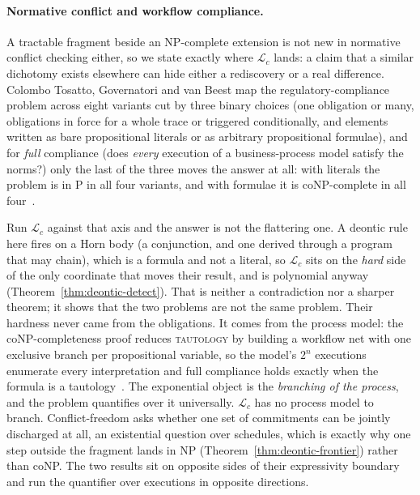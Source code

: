 \documentclass[11pt,a4paper]{article}
\theoremstyle{definition}
\theoremstyle{definition}
\theoremstyle{remark}
\begin{document}
\paragraph{Normative conflict and workflow compliance.} A tractable fragment beside an NP-complete extension is not new in normative conflict checking either, so we
state exactly where $\mathcal{L}_c$ lands: a claim that a similar dichotomy
exists elsewhere can hide either a rediscovery or a real difference. Colombo Tosatto, Governatori and van Beest map
the regulatory-compliance problem across eight variants cut by three binary
choices (one obligation or many, obligations in force for a whole trace or
triggered conditionally, and elements written as bare propositional literals or
as arbitrary propositional formulae), and for \emph{full} compliance (does
\emph{every} execution of a business-process model satisfy the norms?) only the
last of the three moves the answer at all: with literals the problem is in P in
all four variants, and with formulae it is coNP-complete in all
four~.

Run $\mathcal{L}_c$ against that axis and the answer is not the flattering one.
A deontic rule here fires on a Horn body (a conjunction, and one derived
through a program that may chain), which is a formula and not a literal, so
$\mathcal{L}_c$ sits on the \emph{hard} side of the only coordinate that moves
their result, and is polynomial anyway (Theorem~\ref{thm:deontic-detect}). That
is neither a contradiction nor a sharper theorem; it shows that the two
problems are not the same problem. Their hardness never came from the
obligations. It comes from the process model: the coNP-completeness proof
reduces \textsc{tautology} by building a workflow net with one exclusive branch
per propositional variable, so the model's $2^n$ executions enumerate every
interpretation and full compliance holds exactly when the formula is a
tautology~. The exponential object is the \emph{branching of
the process}, and the problem quantifies over it universally. $\mathcal{L}_c$
has no process model to branch. Conflict-freedom asks whether one set of
commitments can be jointly discharged at all, an existential question over
schedules, which is exactly why one step outside the fragment lands in NP
(Theorem~\ref{thm:deontic-frontier}) rather than coNP. The two results sit on
opposite sides of their expressivity boundary and run the quantifier over
executions in opposite directions.
\end{document}
